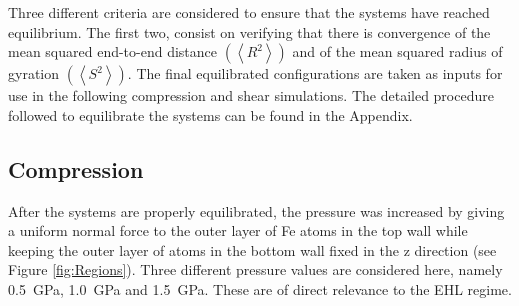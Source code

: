 \documentclass[aps,prb,reprint,superscriptaddress, a4paper]{revtex4-1}
\begin{document}
Three different criteria are considered to ensure that the systems have reached equilibrium. The first two, consist on verifying that there is convergence of the mean squared end-to-end distance $\left(\left< R^2 \right> \right)$ and of the mean squared radius of gyration $\left(\left< S^2 \right> \right)$. The final equilibrated configurations are taken as inputs for use in the following compression and shear simulations. The detailed procedure followed to equilibrate the systems can be found in the Appendix.

\subsection{Compression}

After the systems are properly equilibrated, the pressure was increased by giving a uniform normal force to the outer layer of Fe atoms in the top wall while keeping the outer layer of atoms in the bottom wall fixed in the z direction (see Figure \ref{fig:Regions}). Three different pressure values are considered here, namely \SI{0.5}{\giga\pascal}, \SI{1.0}{\giga\pascal} and \SI{1.5}{\giga\pascal}. These are of direct relevance to the EHL regime\cite{Spikes2014}.
\end{document}
